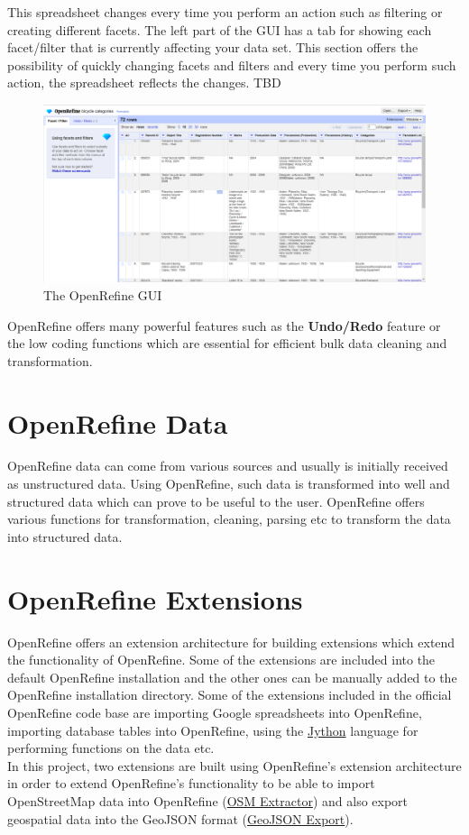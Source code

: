 This spreadsheet changes every time you perform an action such as filtering or creating different facets.
The left part of the GUI has a tab for showing each facet/filter that is currently affecting your data set.
This section offers the possibility of quickly changing facets and filters and every time you perform such action,
the spreadsheet reflects the changes. TBD
\begin{figure}[H]
    \includegraphics[width=\linewidth]{./Figures/OpenRefine/openrefine_gui.png}
    \caption{The OpenRefine GUI}
\end{figure}
OpenRefine offers many powerful features such as the \textbf{Undo/Redo} feature or the low coding functions which are essential for efficient bulk data cleaning and transformation.
\pagebreak
\section{OpenRefine Data}
OpenRefine data can come from various sources and usually is initially received as unstructured data. Using OpenRefine, such data is transformed
into well and structured data which can prove to be useful to the user. OpenRefine offers various functions for transformation, cleaning, parsing etc to
transform the data into structured data.
\section{OpenRefine Extensions}
OpenRefine offers an extension architecture for building extensions which extend the functionality of OpenRefine. Some of the extensions are included
into the default OpenRefine installation and the other ones can be manually added to the OpenRefine installation directory. Some of the extensions included
in the official OpenRefine code base are importing Google spreadsheets into OpenRefine, importing database tables into OpenRefine, using the \href{https://www.jython.org/}{Jython}
language for performing functions on the data etc.\\
\newline
In this project, two extensions are built using OpenRefine's extension architecture in order to extend OpenRefine's functionality to
be able to import OpenStreetMap data into OpenRefine (\hyperref[ch:the-osm-extractor-extension]{OSM Extractor}) and also export geospatial
data into the GeoJSON format (\hyperref[ch:the-geojson-export-extension]{GeoJSON Export}).
